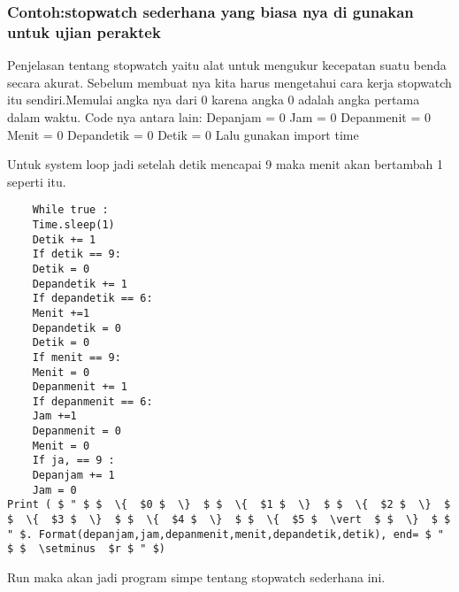 \subsubsection{Contoh:stopwatch sederhana yang biasa nya di gunakan untuk ujian peraktek}
Penjelasan tentang stopwatch yaitu alat untuk mengukur kecepatan suatu benda secara akurat.
Sebelum membuat nya kita harus mengetahui cara kerja stopwatch itu sendiri.Memulai angka nya dari 0 karena angka 0 adalah angka pertama dalam waktu.
Code nya antara lain: 
	Depanjam = 0 
	Jam = 0 
	Depanmenit = 0 
	Menit = 0
	Depandetik = 0 
	Detik = 0 
Lalu gunakan import time 

Untuk system loop jadi setelah detik mencapai 9 maka menit akan bertambah 1 seperti itu.
\begin{verbatim}
	While true : 
	Time.sleep(1)
	Detik += 1 
	If detik == 9: 
	Detik = 0 
	Depandetik += 1 
	If depandetik == 6:
	Menit +=1 
	Depandetik = 0 
	Detik = 0 
	If menit == 9: 
	Menit = 0 
	Depanmenit += 1
	If depanmenit == 6:
	Jam +=1 
	Depanmenit = 0 
	Menit = 0 
	If ja, == 9 : 
	Depanjam += 1 
	Jam = 0 
Print ( $ " $ $  \{  $0 $  \}  $ $  \{  $1 $  \}  $ $  \{  $2 $  \}  $ $  \{  $3 $  \}  $ $  \{  $4 $  \}  $ $  \{  $5 $  \vert  $ $  \}  $ $ " $. Format(depanjam,jam,depanmenit,menit,depandetik,detik), end= $ " $ $  \setminus  $r $ " $) 
\end{verbatim}
Run maka akan jadi program simpe tentang stopwatch sederhana ini.
